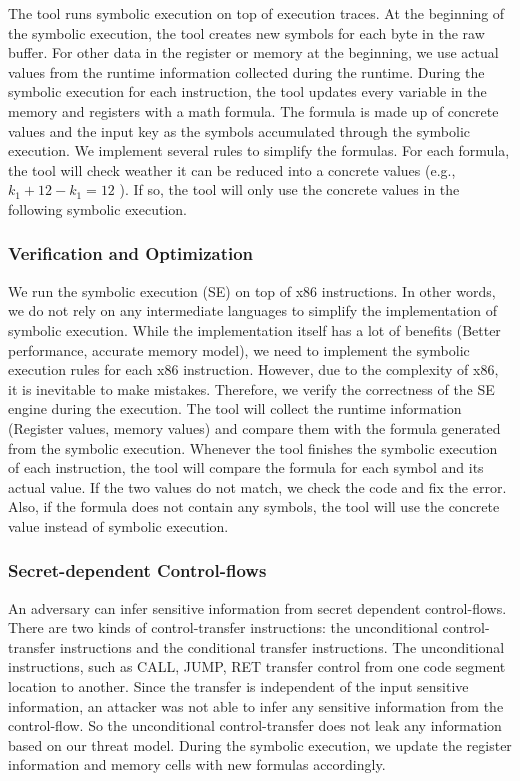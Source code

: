 The tool runs symbolic execution on top of execution traces. At the beginning of the symbolic execution, the tool creates new symbols for each byte in the raw buffer. For other data in the register or memory at the beginning, we use actual values from the runtime information collected during the runtime. During the symbolic execution for each instruction, the tool updates every variable in the memory and registers with a math formula. The formula is made up of concrete values and the input key as the symbols accumulated through the symbolic execution. We implement several rules to simplify the formulas. For each formula, the tool will check weather it can be reduced into a concrete values (e.g., $k_1+12-k_1 = 12$ ). If so, the tool will only use the concrete values in the following symbolic execution.

\subsubsection{Verification and Optimization}
We run the symbolic execution (SE) on top of x86 instructions. In other words, we do not rely on any intermediate languages to simplify the implementation of symbolic execution. While the implementation itself has a lot of benefits (Better performance, accurate memory model), we need to implement the symbolic execution rules for each x86 instruction.
However, due to the complexity of x86, it is inevitable to make mistakes. Therefore, we verify the correctness of the SE engine during the execution.
The tool will collect the runtime information (Register values, memory values) and compare them with the formula generated from the symbolic execution. Whenever the tool finishes the symbolic execution of each instruction, the tool will compare the formula for each symbol and its actual value. If the two values do not match, we check the code and fix the error. Also, if the formula does not contain any symbols, the tool will use the concrete value instead of symbolic execution.

\subsubsection{Secret-dependent Control-flows}
An adversary can infer sensitive information from secret dependent control-flows. There are two kinds of control-transfer instructions: the unconditional control-transfer instructions and the conditional transfer instructions.
The unconditional instructions, such as CALL, JUMP, RET transfer control from one code segment location to another. Since the transfer is independent of the input sensitive information, an attacker was not able to infer any sensitive information from the control-flow.
So the unconditional control-transfer does not leak any information based on our threat model. During the symbolic execution, we update the register information and memory cells with new formulas accordingly.

